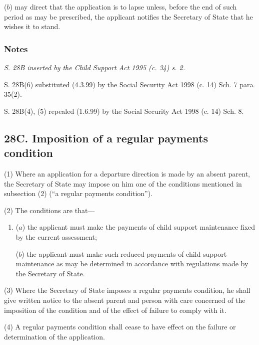 \documentclass[a4paper]{article}
\newcommand\amendment[1]{\subsubsection*{Notes}{\itshape\frenchspacing\footnotesize #1 \par}}
\begin{document}
{\begin{enumerate}
($b$) may direct that the application is to lapse unless, before the end of such period as may be prescribed, the applicant notifies the Secretary of State that he wishes it to stand.
\end{enumerate}

\amendment{
S. 28B inserted by the Child Support Act 1995 (c. 34) s. 2.

S. 28B(6) substituted (4.3.99) by the Social Security Act 1998 (c. 14) Sch. 7 para 35(2).

S. 28B(4), (5) repealed (1.6.99) by the Social Security Act 1998 (c. 14) Sch. 8.



}

\subsection{28C. Imposition of a regular payments condition}

(1) Where an application for a departure direction is made by an absent parent, the Secretary of State may impose on him one of the conditions mentioned in subsection (2) (“a regular payments condition”).

(2) The conditions are that---
\begin{enumerate}\item[]
($a$) the applicant must make the payments of child support maintenance fixed by the current assessment;

($b$) the applicant must make such reduced payments of child support maintenance as may be determined in accordance with regulations made by the Secretary of State.
\end{enumerate}

(3)
Where the Secretary of State imposes a regular payments condition, he shall give written notice to the absent parent and person with care concerned of the imposition of the condition and of the effect of failure to comply with it.

(4)
A regular payments condition shall cease to have effect on the failure or determination of the application.

}
\end{document}
